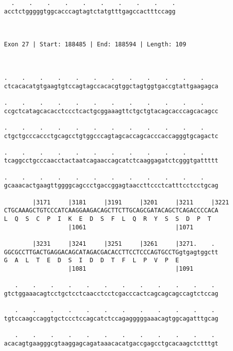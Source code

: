 \documentclass{article}
\begin{document}
\begin{Verbatim}
  .    .    .    .    .    .    .    .    .    .
acctctgggggtggcacccagtagtctatgtttgagccactttccagg
                                                
                                                
 
Exon 27 | Start: 188485 | End: 188594 | Length: 109



.    .    .    .    .    .    .    .    .    .    .    .    
ctcacacatgtgaagtgtccagtagccacacgtggctagtggtgaccgtattgaagagca
                                                            
.    .    .    .    .    .    .    .    .    .    .    .    
ccgctcatagcacacctccctcactgcggaaagttctgctgtacagcacccagcacagcc
                                                            
.    .    .    .    .    .    .    .    .    .    .    .    
ctgctgcccaccctgcagcctgtggcccagtagcaccagcacccaccagggtgcagactc
                                                            
.    .    .    .    .    .    .    .    .    .    .    .    
tcaggcctgcccaacctactaatcagaaccagcatctcaaggagatctcgggtgattttt
                                                            
.    .    .    .    .    .    .    .    .    .    .    .    
gcaaacactgaagttggggcagccctgaccggagtaaccttccctcatttcctcctgcag
                                                            
        |3171     |3181     |3191     |3201     |3211     |3221
CTGCAAAGCTGTCCCATCAAGGAAGACAGCTTCTTGCAGCGATACAGCTCAGACCCCACA
L  Q  S  C  P  I  K  E  D  S  F  L  Q  R  Y  S  S  D  P  T  
                  |1061                         |1071       
  
        |3231     |3241     |3251     |3261     |3271.    . 
GGCGCCTTGACTGAGGACAGCATAGACGACACCTTCCTCCCAGTGCCTGgtgagtggctt
G  A  L  T  E  D  S  I  D  D  T  F  L  P  V  P  E           
                  |1081                         |1091       
  
   .    .    .    .    .    .    .    .    .    .    .    . 
gtctggaaacagtcctgctcctcaacctcctcgacccactcagcagcagccagtctccag
                                                            
   .    .    .    .    .    .    .    .    .    .    .    . 
tgtccaagccaggtgctccctccagcatctccagagggggaaacagtggcagatttgcag
                                                            
   .    .    .    .    .    .    .    .    .    .    .    . 
acacagtgaagggcgtaaggagcagataaacacatgaccgagcctgcacaagctctttgt
                                                            

\end{Verbatim}
\end{document}
